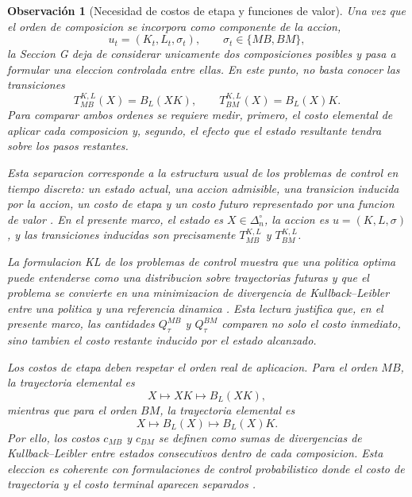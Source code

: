 ﻿\documentclass[12pt]{article}
\newtheorem{observacion}{Observación}[section]
\begin{document}
\begin{observacion}[Necesidad de costos de etapa y funciones de valor]\label{obs:necesidad_costos_valor_orden}
Una vez que el orden de composicion se incorpora como componente de la accion,
\[
u_t=(K_t,L_t,\sigma_t),
\qquad
\sigma_t\in\{MB,BM\},
\]
la Seccion G deja de considerar unicamente dos composiciones posibles y pasa a formular una eleccion controlada entre ellas. En este punto, no basta conocer las transiciones
\[
T_{MB}^{K,L}(X)=B_L(XK),
\qquad
T_{BM}^{K,L}(X)=B_L(X)K.
\]
Para comparar ambos ordenes se requiere medir, primero, el costo elemental de aplicar cada composicion y, segundo, el efecto que el estado resultante tendra sobre los pasos restantes.

Esta separacion corresponde a la estructura usual de los problemas de control en tiempo discreto: un estado actual, una accion admisible, una transicion inducida por la accion, un costo de etapa y un costo futuro representado por una funcion de valor \citep{Todorov2009EfficientComputationOptimalActions}. En el presente marco, el estado es \(X\in\Delta_n^\circ\), la accion es \(u=(K,L,\sigma)\), y las transiciones inducidas son precisamente \(T_{MB}^{K,L}\) y \(T_{BM}^{K,L}\).

La formulacion KL de los problemas de control muestra que una politica optima puede entenderse como una distribucion sobre trayectorias futuras y que el problema se convierte en una minimizacion de divergencia de Kullback--Leibler entre una politica y una referencia dinamica \citep{KappenGomezOpper2012OptimalControlAsAGraphicalModelInferenceProblem}. Esta lectura justifica que, en el presente marco, las cantidades \(Q_\tau^{MB}\) y \(Q_\tau^{BM}\) comparen no solo el costo inmediato, sino tambien el costo restante inducido por el estado alcanzado.

Los costos de etapa deben respetar el orden real de aplicacion. Para el orden \(MB\), la trayectoria elemental es
\[
X
\longmapsto
XK
\longmapsto
B_L(XK),
\]
mientras que para el orden \(BM\), la trayectoria elemental es
\[
X
\longmapsto
B_L(X)
\longmapsto
B_L(X)K.
\]
Por ello, los costos \(c_{MB}\) y \(c_{BM}\) se definen como sumas de divergencias de Kullback--Leibler entre estados consecutivos dentro de cada composicion. Esta eleccion es coherente con formulaciones de control probabilistico donde el costo de trayectoria y el costo terminal aparecen separados \citep{Kappen2005LinearTheoryForControlOfNonLinearStochasticSystems}.


\end{observacion}
\end{document}
